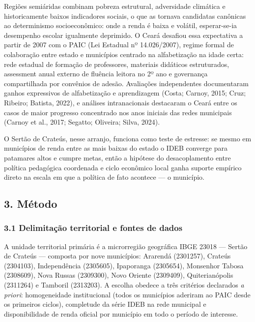 \documentclass[
  brazilian,
  12pt,
  a4paper,
]{article}
\begin{document}
Regiões semiáridas combinam pobreza estrutural, adversidade climática e
historicamente baixos indicadores sociais, o que as tornava candidatas
canônicas ao determinismo socioeconômico: onde a renda é baixa e
volátil, esperar-se-ia desempenho escolar igualmente deprimido. O Ceará
desafiou essa expectativa a partir de 2007 com o PAIC (Lei Estadual nº
14.026/2007), regime formal de colaboração entre estado e municípios
centrado na alfabetização na idade certa: rede estadual de formação de
professores, materiais didáticos estruturados, assessment anual externo
de fluência leitora no 2º ano e governança compartilhada por convênios
de adesão. Avaliações independentes documentaram ganhos expressivos de
alfabetização e aprendizagem (Costa; Carnoy, 2015; Cruz; Ribeiro;
Batista, 2022), e análises intranacionais destacaram o Ceará entre os
casos de maior progresso concentrado nos anos iniciais das redes
municipais (Carnoy et al., 2017; Segatto; Oliveira; Silva, 2024).

O Sertão de Crateús, nesse arranjo, funciona como teste de estresse: se
mesmo em municípios de renda entre as mais baixas do estado o IDEB
converge para patamares altos e cumpre metas, então a hipótese do
desacoplamento entre política pedagógica coordenada e ciclo econômico
local ganha suporte empírico direto na escala em que a política de fato
acontece --- o município.

\subsection{3. Método}\label{muxe9todo}

\subsubsection{3.1 Delimitação territorial e fontes de
dados}\label{delimitauxe7uxe3o-territorial-e-fontes-de-dados}

A unidade territorial primária é a microrregião geográfica IBGE 23018
--- Sertão de Crateús --- composta por nove municípios: Ararendá
(2301257), Crateús (2304103), Independência (2305605), Ipaporanga
(2305654), Monsenhor Tabosa (2308609), Nova Russas (2309300), Novo
Oriente (2309409), Quiterianópolis (2311264) e Tamboril (2313203). A
escolha obedece a três critérios declarados \emph{a priori}:
homogeneidade institucional (todos os municípios aderiram ao PAIC desde
os primeiros ciclos), completude da série IDEB na rede municipal e
disponibilidade de renda oficial por município em todo o período de
interesse.
\end{document}
